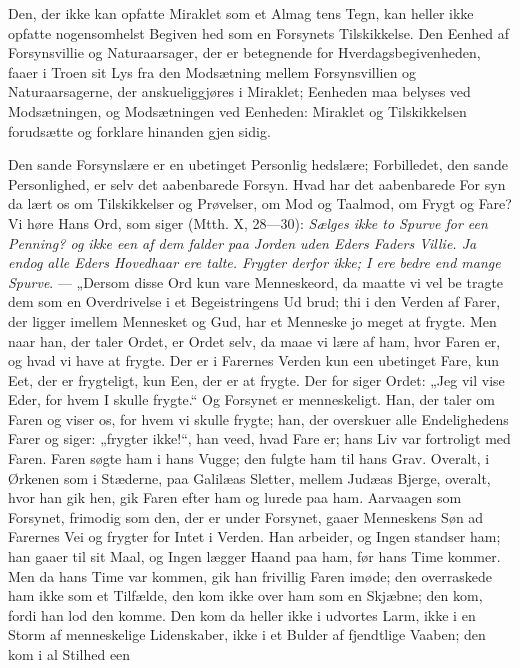 \documentclass[12pt]{book}
\newcommand{\opage}[1]{\marginnote{\footnotesize\textit{[#1]}}}
\begin{document}
Den, der ikke kan opfatte Miraklet som et Almag\-%
tens Tegn, kan heller ikke opfatte nogensomhelst Begiven\-%
hed som en Forsynets Tilskikkelse. Den Eenhed af
Forsynsvillie og Naturaarsager, der er betegnende for
Hverdagsbegivenheden, faaer i Troen sit Lys fra den
Modsætning mellem Forsynsvillien og Naturaarsagerne, der
anskueliggjøres i Miraklet; Eenheden maa belyses ved
Modsætningen, og Modsætningen ved Eenheden: Miraklet
og Tilskikkelsen forudsætte og forklare hinanden gjen\-%
sidig.

Den sande Forsynslære er en ubetinget Personlig\-%
hedslære; Forbilledet, den sande Personlighed, er selv
det aabenbarede Forsyn. Hvad har det aabenbarede For\-%
syn da lært os om Tilskikkelser og Prøvelser, om Mod
og Taalmod, om Frygt og Fare? Vi høre Hans Ord, som
siger (Mtth. X, 28---30): \emph{Sælges ikke to Spurve
for een Penning? og ikke een af dem falder paa
Jorden uden Eders Faders Villie. Ja endog
alle Eders Hovedhaar ere talte. Frygter derfor
ikke; I ere bedre end mange Spurve}. --- „Dersom
disse Ord kun vare Menneskeord, da maatte vi vel be\-%
tragte dem som en Overdrivelse i et Begeistringens Ud\-%
brud; thi i den Verden af Farer, der ligger imellem
Mennesket og Gud, har et Menneske jo meget at frygte.
\opage{223}\setcounter{footnote}{0}%
Men naar han, der taler Ordet, er Ordet selv, da maae
vi lære af ham, hvor Faren er, og hvad vi have at frygte.
Der er i Farernes Verden kun een ubetinget Fare, kun
Eet, der er frygteligt, kun Een, der er at frygte. Der\-%
for siger Ordet: „Jeg vil vise Eder, for hvem I skulle
frygte.“ Og Forsynet er menneskeligt. Han, der taler
om Faren og viser os, for hvem vi skulle frygte; han,
der overskuer alle Endelighedens Farer og siger: „frygter
ikke!“, han veed, hvad Fare er; hans Liv var fortroligt
med Faren. Faren søgte ham i hans Vugge; den fulgte
ham til hans Grav. Overalt, i Ørkenen som i Stæderne,
paa Galilæas Sletter, mellem Judæas Bjerge, overalt,
hvor han gik hen, gik Faren efter ham og lurede paa
ham. Aarvaagen som Forsynet, frimodig som den, der
er under Forsynet, gaaer Menneskens Søn ad Farernes
Vei og frygter for Intet i Verden. Han arbeider,
og Ingen standser ham; han gaaer til sit Maal, og Ingen
lægger Haand paa ham, før hans Time kommer. Men
da hans Time var kommen, gik han frivillig Faren imøde;
den overraskede ham ikke som et Tilfælde, den kom
ikke over ham som en Skjæbne; den kom, fordi han lod
den komme. Den kom da heller ikke i udvortes Larm,
ikke i en Storm af menneskelige Lidenskaber, ikke i et
Bulder af fjendtlige Vaaben; den kom i al Stilhed een\-%
\end{document}
